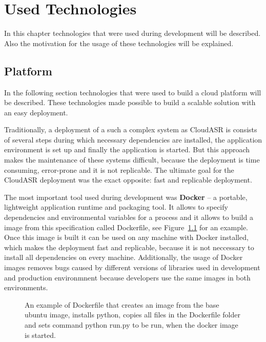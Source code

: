 \chapter{Used Technologies}\label{sec:technologies}
In this chapter technologies that were used during development will be described.
Also the motivation for the usage of these technologies will be explained.

\section{Platform}
In the following section technologies that were used to build a cloud platform will be described.
These technologies made possible to build a scalable solution with an easy deployment.

Traditionally, a deployment of a such a complex system as CloudASR is consists of several steps
  during which necessary dependencies are installed,
  the application environment is set up
  and finally the application is started.
But this approach makes the maintenance of these systems difficult,
  because the deployment is time consuming, error-prone and it is not replicable.
The ultimate goal for the CloudASR deployment was the exact opposite: fast and replicable deployment.

The most important tool used during development was \textbf{Docker} \cite{merkel2014docker}
  -- a portable, lightweight application runtime and packaging tool.
It allows to specify dependencies and environmental variables for a process
  and it allows to build a image from this specification called Dockerfile,
  see Figure~\ref{fig:dockerfile} for an example.
Once this image is built it can be used on any machine with Docker installed,
  which makes the deployment fast and replicable,
  because it is not neccessary to install all dependencies on every machine.
Additionally, the usage of Docker images removes bugs caused by different versions of libraries used in development and production environmnent
  because developers use the same images in both environments.

\begin{figure}[h]
  

  \caption{
    An example of Dockerfile that creates an image from the base ubuntu image,
      installs python,
      copies all files in the Dockerfile folder
      and sets command python run.py to be run,
        when the docker image is started.
  }
  \label{fig:dockerfile}
\end{figure}


